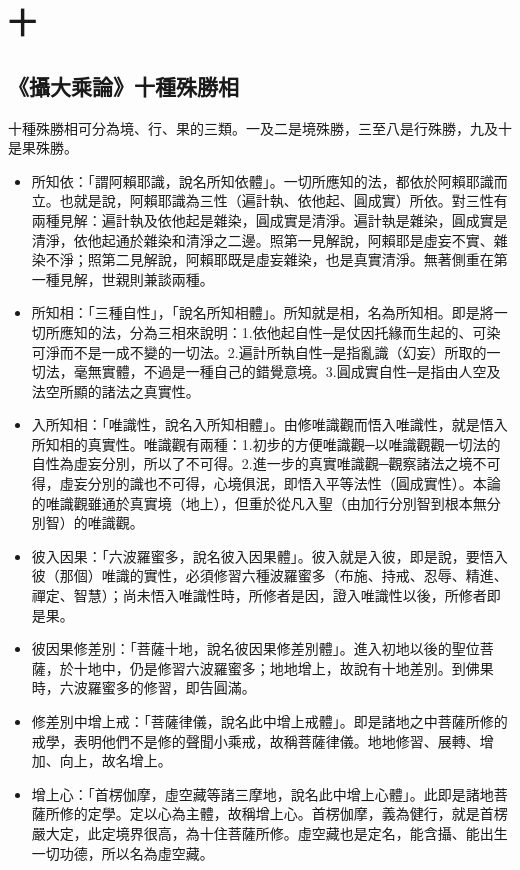 \section{十}

\subsection{《攝大乘論》十種殊勝相}
十種殊勝相可分為境、行、果的三類。一及二是境殊勝，三至八是行殊勝，九及十是果殊勝。
\begin{itemize}
  \item 所知依：「謂阿賴耶識，說名所知依體」。一切所應知的法，都依於阿賴耶識而立。也就是說，阿賴耶識為三性（遍計執、依他起、圓成實）所依。對三性有兩種見解：遍計執及依他起是雜染，圓成實是清淨。遍計執是雜染，圓成實是清淨，依他起通於雜染和清淨之二邊。照第一見解說，阿賴耶是虛妄不實、雜染不淨；照第二見解說，阿賴耶既是虛妄雜染，也是真實清淨。無著側重在第一種見解，世親則兼談兩種。
  \item 所知相：「三種自性」，「說名所知相體」。所知就是相，名為所知相。即是將一切所應知的法，分為三相來說明：1.依他起自性─是仗因托緣而生起的、可染可淨而不是一成不變的一切法。2.遍計所執自性─是指亂識（幻妄）所取的一切法，毫無實體，不過是一種自己的錯覺意境。3.圓成實自性─是指由人空及法空所顯的諸法之真實性。
  \item 入所知相：「唯識性，說名入所知相體」。由修唯識觀而悟入唯識性，就是悟入所知相的真實性。唯識觀有兩種：1.初步的方便唯識觀─以唯識觀觀一切法的自性為虛妄分別，所以了不可得。2.進一步的真實唯識觀─觀察諸法之境不可得，虛妄分別的識也不可得，心境俱泯，即悟入平等法性（圓成實性）。本論的唯識觀雖通於真實境（地上），但重於從凡入聖（由加行分別智到根本無分別智）的唯識觀。
  \item 彼入因果：「六波羅蜜多，說名彼入因果體」。彼入就是入彼，即是說，要悟入彼（那個）唯識的實性，必須修習六種波羅蜜多（布施、持戒、忍辱、精進、禪定、智慧）；尚未悟入唯識性時，所修者是因，證入唯識性以後，所修者即是果。
  \item 彼因果修差別：「菩薩十地，說名彼因果修差別體」。進入初地以後的聖位菩薩，於十地中，仍是修習六波羅蜜多；地地增上，故說有十地差別。到佛果時，六波羅蜜多的修習，即告圓滿。
  \item 修差別中增上戒：「菩薩律儀，說名此中增上戒體」。即是諸地之中菩薩所修的戒學，表明他們不是修的聲聞小乘戒，故稱菩薩律儀。地地修習、展轉、增加、向上，故名增上。
  \item 增上心：「首楞伽摩，虛空藏等諸三摩地，說名此中增上心體」。此即是諸地菩薩所修的定學。定以心為主體，故稱增上心。首楞伽摩，義為健行，就是首楞嚴大定，此定境界很高，為十住菩薩所修。虛空藏也是定名，能含攝、能出生一切功德，所以名為虛空藏。

\end{itemize}
